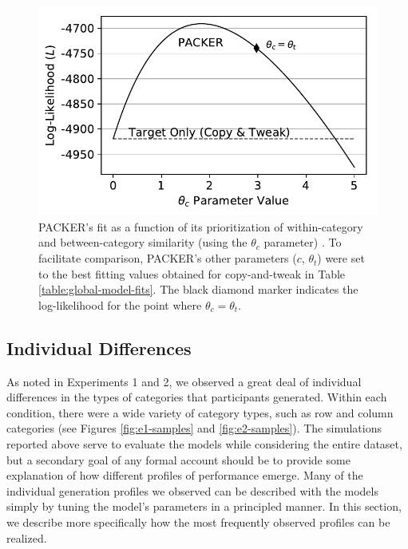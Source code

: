 \documentclass[pdflatex,sn-apa]{sn-jnl}%
\theoremstyle{thmstyleone}%
\theoremstyle{thmstyletwo}%
\theoremstyle{thmstylethree}%
\begin{document}
\begin{figure}
    \begin{center}
      \includegraphics[width=\textwidth]{figs/packer-loglike.pdf}    
      \caption{PACKER's fit as a function of its prioritization of
        within-category and between-category similarity (using the $\theta_c$
        parameter) . To facilitate comparison, PACKER's other parameters ($c$,
        $\theta_t$) were set to the best fitting values obtained for
        copy-and-tweak in Table \ref{table:global-model-fits}. The black diamond
        marker indicates the log-likelihood for the point where
        $\theta_c=\theta_t$. }
    \label{fig:packer-loglike}
    \end{center}
\end{figure}


\subsection{Individual Differences}
\label{section:individual-diffs}

As noted in Experiments 1 and 2, we observed a great deal of individual
differences in the types of categories that participants generated. Within each
condition, there were a wide variety of category types, such as row and column
categories (see Figures \ref{fig:e1-samples} and \ref{fig:e2-samples}). The
simulations reported above serve to evaluate the models while considering the
entire dataset, but a secondary goal of any formal account should be to provide
some explanation of how different profiles of performance emerge. Many of the
individual generation profiles we observed can be described with the models
simply by tuning the model's parameters in a principled manner. In this section,
we describe more specifically how the most frequently observed profiles can be
realized.
\end{document}
